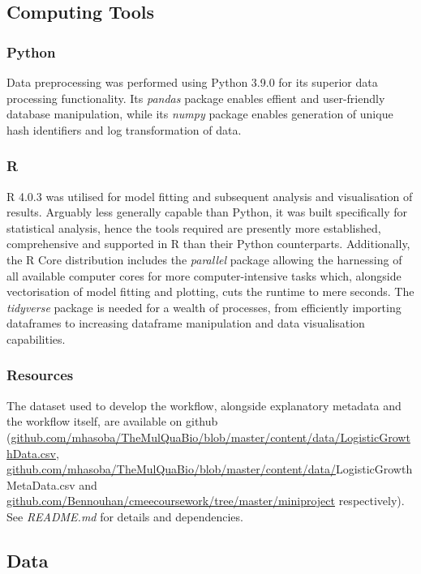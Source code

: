 \documentclass[11pt]{article}
\begin{document}
\subsection{Computing Tools}

\subsubsection{Python}
Data preprocessing was performed using Python 3.9.0 for its superior data processing functionality. Its \textit{pandas} package enables effient and user-friendly database manipulation, while its \textit{numpy} package enables generation of unique hash identifiers and log transformation of data.

\subsubsection{R}
R 4.0.3 was utilised for model fitting and subsequent analysis and visualisation of results. Arguably less generally capable than Python, it was built specifically for statistical analysis, hence the tools required are presently more established, comprehensive and supported in R than their Python counterparts. Additionally, the R Core distribution includes the \textit{parallel} package allowing the harnessing of all available computer cores for more computer-intensive tasks which, alongside vectorisation of model fitting and plotting, cuts the runtime to mere seconds. The \textit{tidyverse} package is needed for a wealth of processes, from efficiently importing dataframes to increasing dataframe manipulation and data visualisation capabilities. 

\subsubsection{Resources}
The dataset used to develop the workflow, alongside explanatory metadata and the workflow itself, are available on github (\url{github.com/mhasoba/TheMulQuaBio/blob/master/content/data/LogisticGrowthData.csv}, \url{github.com/mhasoba/TheMulQuaBio/blob/master/content/data/}LogisticGrowthMetaData.csv and \url{github.com/Bennouhan/cmeecoursework/tree/master/miniproject} respectively). See \textit{README.md} for details and dependencies.


\subsection{Data}
\end{document}

